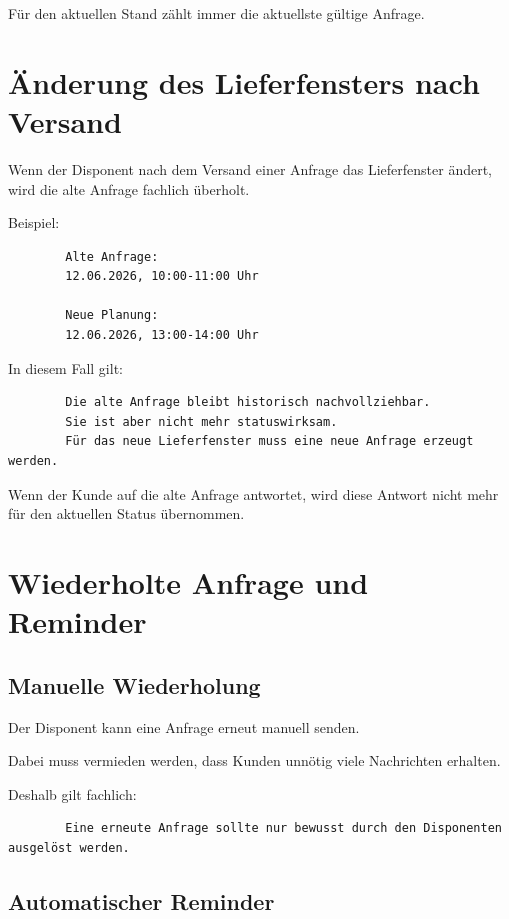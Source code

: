 \documentclass[12pt,a4paper]{article}
\begin{document}
	Für den aktuellen Stand zählt immer die aktuellste gültige Anfrage.
	
	\section{Änderung des Lieferfensters nach Versand}
	
	Wenn der Disponent nach dem Versand einer Anfrage das Lieferfenster ändert, wird die alte Anfrage fachlich überholt.
	
	Beispiel:
	
	\begin{lstlisting}
		Alte Anfrage:
		12.06.2026, 10:00-11:00 Uhr
		
		Neue Planung:
		12.06.2026, 13:00-14:00 Uhr
	\end{lstlisting}
	
	In diesem Fall gilt:
	
	\begin{lstlisting}
		Die alte Anfrage bleibt historisch nachvollziehbar.
		Sie ist aber nicht mehr statuswirksam.
		Für das neue Lieferfenster muss eine neue Anfrage erzeugt werden.
	\end{lstlisting}
	
	Wenn der Kunde auf die alte Anfrage antwortet, wird diese Antwort nicht mehr für den aktuellen Status übernommen.
	
	\section{Wiederholte Anfrage und Reminder}
	
	\subsection{Manuelle Wiederholung}
	
	Der Disponent kann eine Anfrage erneut manuell senden.
	
	Dabei muss vermieden werden, dass Kunden unnötig viele Nachrichten erhalten.
	
	Deshalb gilt fachlich:
	
	\begin{lstlisting}
		Eine erneute Anfrage sollte nur bewusst durch den Disponenten ausgelöst werden.
	\end{lstlisting}
	
	\subsection{Automatischer Reminder}
	
\end{document}
